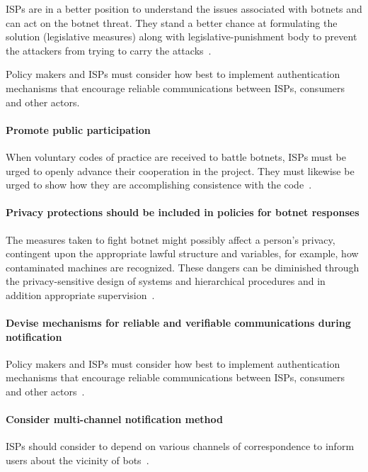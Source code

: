 ISPs are in a better position to understand the issues associated with botnets and can act on the botnet threat. They stand a better chance at formulating the solution (legislative measures) along with legislative-punishment body to prevent the attackers from trying to carry the attacks~\cite{stankovic2009defense}.


Policy makers and ISPs must consider how best to implement authentication mechanisms that encourage reliable communications between ISPs, consumers and other actors.




\paragraph{Promote public participation}
When voluntary codes of practice are received to battle botnets, ISPs must be urged to openly advance their cooperation in the project. They must likewise be urged to show how they are accomplishing consistence with the code~\cite{OECD}.


\paragraph{Privacy protections should be included in policies for botnet responses}
The measures taken to fight botnet might possibly affect a person’s privacy, contingent upon the appropriate lawful structure and variables, for example, how contaminated machines are recognized. These dangers can be diminished through the privacy-sensitive design of systems and hierarchical procedures and in addition appropriate supervision~\cite{OECD}.


\paragraph{Devise mechanisms for reliable and verifiable communications during notification}
Policy makers and ISPs must consider how best to implement authentication mechanisms that encourage reliable communications between ISPs, consumers and other actors~\cite{OECD}.

\paragraph{Consider multi-channel notification method}
ISPs should consider to depend on various channels of correspondence to inform users about the vicinity of bots~\cite{OECD}.

